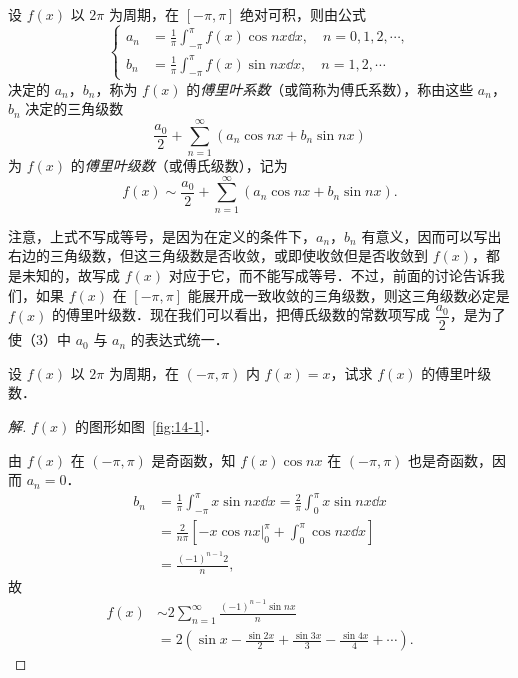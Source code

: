 \begin{definition}\label{def:14-1}
设 $f(x)$ 以 $2\pi$ 为周期，在 $[-\pi,\pi]$ 绝对可积，则由公式
\[
\left\{\begin{aligned}
a_{n}&=\frac{1}{\pi}\int_{-\pi}^{\pi}f(x)\cos nx\dd x,\quad n=0,1,2,\cdots,\\
b_{n}&=\frac{1}{\pi}\int_{-\pi}^{\pi}f(x)\sin nx\dd x,\quad n=1,2,\cdots
\end{aligned}\right.
\]
决定的 $a_{n}$，$b_{n}$，称为 $f(x)$ 的\emph{傅里叶系数}（或简称为傅氏系数），称由这些 $a_{n}$，$b_{n}$ 决定的三角级数
\[
\frac{a_{0}}{2}+\sum_{n=1}^{\infty}\left(a_{n}\cos nx+b_{n}\sin nx\right)
\]
为 $f(x)$ 的\emph{傅里叶级数}（或傅氏级数），记为
\[
f(x)\sim\frac{a_{0}}{2}+\sum_{n=1}^{\infty}\left(a_{n}\cos nx+b_{n}\sin nx\right).
\]
\end{definition}

注意，上式不写成等号，是因为在定义的条件下，$a_{n}$，$b_{n}$ 有意义，因而可以写出右边的三角级数，但这三角级数是否收敛，或即使收敛但是否收敛到 $f(x)$，都是未知的，故写成 $f(x)$ 对应于它，而不能写成等号．不过，前面的讨论告诉我们，如果 $f(x)$ 在 $[-\pi,\pi]$ 能展开成一致收敛的三角级数，则这三角级数必定是 $f(x)$ 的傅里叶级数．现在我们可以看出，把傅氏级数的常数项写成 $\dfrac{a_{0}}{2}$，是为了使（3）中 $a_{0}$ 与 $a_{n}$ 的表达式统一．

\begin{example}\label{ex:14-1-1}
设 $f(x)$ 以 $2\pi$ 为周期，在 $(-\pi,\pi)$ 内 $f(x)=x$，试求 $f(x)$ 的傅里叶级数．
\end{example}

\begin{proof}[解]
$f(x)$ 的图形如图~\ref{fig:14-1}．

由 $f(x)$ 在 $(-\pi,\pi)$ 是奇函数，知 $f(x)\cos nx$ 在 $(-\pi,\pi)$ 也是奇函数，因而 $a_{n}=0$．
\[
\begin{aligned}
b_{n}&=\frac{1}{\pi}\int_{-\pi}^{\pi}x\sin nx\dd x=\frac{2}{\pi}\int_{0}^{\pi}x\sin nx\dd x\\
&=\frac{2}{n\pi}\left[-\left.x\cos nx\right|_{0}^{\pi}+\int_{0}^{\pi}\cos nx\dd x\right]\\
&=\frac{(-1)^{n-1}2}{n},
\end{aligned}
\]
故
\[
\begin{aligned}
f(x)&\sim 2\sum_{n=1}^{\infty}\frac{(-1)^{n-1}\sin nx}{n}\\
&=2\left(\sin x-\frac{\sin 2x}{2}+\frac{\sin 3x}{3}-\frac{\sin 4x}{4}+\cdots\right).
\end{aligned}
\]
\end{proof}

